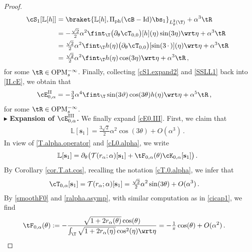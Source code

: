 \documentclass[a4paper,reqno,10pt]{article}
\newcommand{\pa}{\partial}
\newcommand{\OpM}{{\rm O}{\rm P}{\rm M}}
\newcommand{\LL}{\mathbb{L}}
\begin{document}
\begin{proof}
\begin{align}
        \cS_{1}[\LL[h]] & = \braket{\LL[h],\Pi_{\rm ph}(\cB-{\rm Id})\bs_{1}}_{L_\theta^2(\T)} + \alpha^3 \tR \\
        & = - \tfrac{\sqrt 2}{2} \alpha^2 \fint_{\T} \big(\pa_{\theta}\cT_{0,0} \big)[h](\eta) \sin(3\eta) \wrt \eta + \alpha^3 \tR \\
        & =  \tfrac{\sqrt 2}{2} \alpha^2 \fint_{\T} h(\eta) \big(\pa_{\theta}\cT_{0,0} \big)[\sin(3\,\cdot\,)](\eta) \wrt \eta + \alpha^3 \tR \\
        & =  \tfrac{\sqrt 2}{2} \alpha^2 \fint_{\T} h(\eta) \cos(3\eta) \wrt\eta + \alpha^3 \tR \,, \label{cS1.expand2}
     \end{align}
     for some $\tR \in\OpM_{s}^{-\infty}$. Finally, collecting \eqref{cS1.expand2} and \eqref{SSLL1} back into \eqref{II.cE}, we obtain that
     \begin{align}
         \cE_{0,\alpha}^{\rm II} & = -\tfrac32 \alpha^4 \fint_{\T} \sin(3\vartheta) \cos(3\theta) h(\eta) \wrt\eta+ \alpha^5 \tR \,, \label{stepII}
     \end{align}
     for some $\tR \in\OpM_{s}^{-\infty}$.
\\[1mm]
\noindent $\blacktriangleright$ {\bf Expansion of $\cE_{0,\alpha}^{\rm III}$.} We finally expand \eqref{cE0.III}. First, we claim that
	\begin{align}\label{LL[s1]}
	\mathbb{L}[\mathbf{s}_1]= \tfrac{3\sqrt{2}}{2}\alpha^2\cos(3\theta)+O(\alpha^3)  \,.
\end{align}
In view of \eqref{T.alpha.operator} and \eqref{cL0.alpha}, we write
     \begin{align}
	\mathbb{L}[\mathbf{s}_1]= \pa_{\theta} \big(\mathcal{T}(r_\alpha;\alpha)[\mathbf{s}_1] + \tF_{0,\alpha}(\theta) \cK_{0,\alpha}[\mathbf{s}_1]\big)  \,. \label{LL.at.s1}
\end{align}
By Corollary \ref{cor.T.at.cos}, recalling the notation \eqref{cT.0.alpha}, we infer that	
\begin{align}\label{form-tham}
	\cT_{0,\alpha}[\mathbf{s}_1]=\mathcal{T}(r_\alpha;\alpha)[\mathbf{s}_1] &=   \tfrac{\sqrt{2}}{2} \alpha^2\sin(3\theta)  +O( \alpha^3)\,.
\end{align}	
By \eqref{smoothF0} and \eqref{ralpha.asymp}, with similar computation as in \eqref{cicap1}, we find
	\begin{align}\label{f0-forma}
		\tF_{0,\alpha}(\theta) & := - \frac{\sqrt{1+2r_\alpha(\theta)}\cos(\theta)}{\int_{\T}\sqrt{1+2r_\alpha(\eta)}\cos^2(\eta)\wrt\eta} =-\tfrac{1}{\pi}\cos(\theta)+O(\alpha^2)  \,.

\end{align}
\end{proof}
\end{document}
